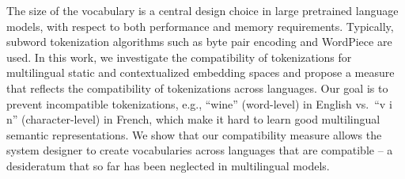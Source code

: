 The size of the vocabulary is a central design choice in large pretrained language models, with respect to both performance and memory requirements. Typically, subword tokenization algorithms such as byte pair encoding and WordPiece are used.  In this work, we investigate the compatibility of tokenizations for multilingual static and contextualized embedding spaces and propose a measure that reflects the compatibility of tokenizations across languages.  Our goal is to prevent incompatible tokenizations, e.g., ``wine'' (word-level) in English vs.\ ``v i n'' (character-level) in French, which make it hard to learn good multilingual semantic representations.  We show that our compatibility measure allows the system designer to create vocabularies across languages that are compatible -- a desideratum that so far has been neglected in multilingual models.
